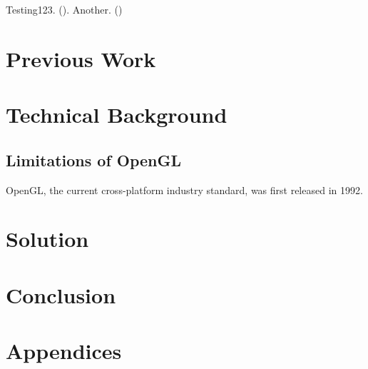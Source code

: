 \documentclass[12pt]{report}
\newcommand{\citebu}[1]{\citeauthor{#1} (\citeyear{#1})}
\theoremstyle{definition}
\begin{document}
    Testing123. \citebu{attiya1995sharing}. Another. \citebu{beyer2016site}

  \chapter{Previous Work}

  \chapter{Technical Background}

    \section{Limitations of OpenGL}
    OpenGL, the current cross-platform industry standard, was first released in 1992.

  \chapter{Solution}

  \chapter{Conclusion}

  
  

  \chapter*{Appendices}
  
\end{document}
